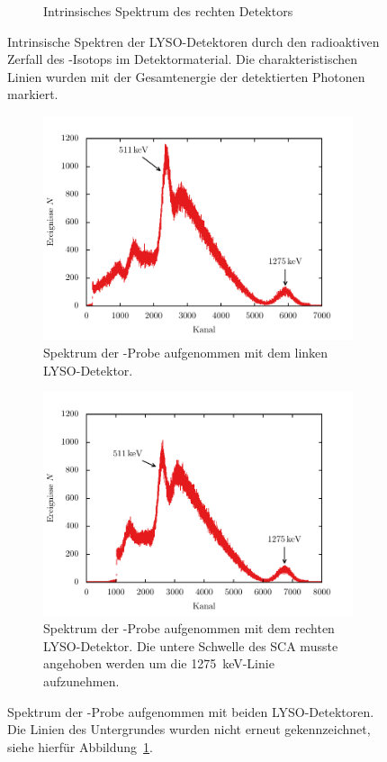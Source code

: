 \documentclass[11pt, a4paper]{article}
\numberwithin{equation}{section}
\begin{document}
\begin{figure}[htbp]
\begin{subfigure}{\textwidth}
		\caption{Intrinsisches Spektrum des rechten Detektors}
	\end{subfigure}
	\caption{Intrinsische Spektren der LYSO-Detektoren durch den radioaktiven Zerfall des -Isotops im Detektormaterial. Die charakteristischen Linien wurden mit der Gesamtenergie der detektierten Photonen markiert.}
	\label{fig:lyso_spektren}
\end{figure}
\begin{figure}[htbp]
	\begin{subfigure}{\textwidth}
		\centering
		\includegraphics[width=\textwidth]{./figures/na_links}
		\caption{Spektrum der -Probe aufgenommen mit dem linken LYSO-Detektor.}
	\end{subfigure}
	\begin{subfigure}{\textwidth}
		\centering
		\includegraphics[width=\textwidth]{./figures/na_rechts}
		\caption{Spektrum der -Probe aufgenommen mit dem rechten LYSO-Detektor. Die untere Schwelle des SCA musste angehoben werden um die \SI{1275}{\keV}-Linie aufzunehmen.}
		\label{fig:na_rechts}
	\end{subfigure}
	\caption{Spektrum der -Probe aufgenommen mit beiden LYSO-Detektoren. Die Linien des Untergrundes wurden nicht erneut gekennzeichnet, siehe hierfür Abbildung~\ref{fig:lyso_spektren}.}
	\label{fig:na_spektren}
\end{figure}
\end{document}

